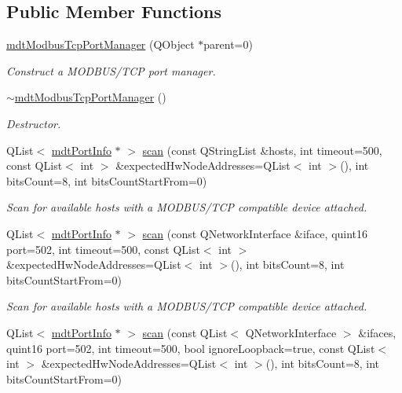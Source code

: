 \subsection*{Public Member Functions}
\begin{DoxyCompactItemize}
\item 
\hyperlink{classmdt_modbus_tcp_port_manager_a2f65f779bbad19d9d3f85ef35220ffb8}{mdtModbusTcpPortManager} (QObject $\ast$parent=0)
\begin{DoxyCompactList}\small\item\em Construct a MODBUS/TCP port manager. \end{DoxyCompactList}\item 
\hyperlink{classmdt_modbus_tcp_port_manager_aabe51a50a53c6b23884cc4862730b731}{$\sim$mdtModbusTcpPortManager} ()
\begin{DoxyCompactList}\small\item\em Destructor. \end{DoxyCompactList}\item 
QList$<$ \hyperlink{classmdt_port_info}{mdtPortInfo} $\ast$ $>$ \hyperlink{classmdt_modbus_tcp_port_manager_a41d366dbf944346b6b0466d4618b9625}{scan} (const QStringList \&hosts, int timeout=500, const QList$<$ int $>$ \&expectedHwNodeAddresses=QList$<$ int $>$(), int bitsCount=8, int bitsCountStartFrom=0)
\begin{DoxyCompactList}\small\item\em Scan for available hosts with a MODBUS/TCP compatible device attached. \end{DoxyCompactList}\item 
QList$<$ \hyperlink{classmdt_port_info}{mdtPortInfo} $\ast$ $>$ \hyperlink{classmdt_modbus_tcp_port_manager_a5537ba29f5d54980a8c10bbd3e41bea5}{scan} (const QNetworkInterface \&iface, quint16 port=502, int timeout=500, const QList$<$ int $>$ \&expectedHwNodeAddresses=QList$<$ int $>$(), int bitsCount=8, int bitsCountStartFrom=0)
\begin{DoxyCompactList}\small\item\em Scan for available hosts with a MODBUS/TCP compatible device attached. \end{DoxyCompactList}\item 
QList$<$ \hyperlink{classmdt_port_info}{mdtPortInfo} $\ast$ $>$ \hyperlink{classmdt_modbus_tcp_port_manager_a88b57abd1ce0b8017619c13fce4c695d}{scan} (const QList$<$ QNetworkInterface $>$ \&ifaces, quint16 port=502, int timeout=500, bool ignoreLoopback=true, const QList$<$ int $>$ \&expectedHwNodeAddresses=QList$<$ int $>$(), int bitsCount=8, int bitsCountStartFrom=0)

\end{DoxyCompactItemize}

